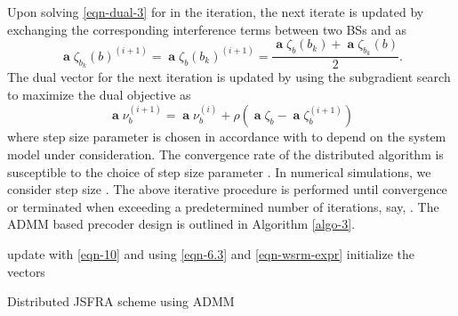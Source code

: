 Upon solving \eqref{eqn-dual-3} for  in the  iteration, the next iterate is updated by exchanging the corresponding interference terms between two \acp{BS}  and  as
\begin{equation}
\mbfa{\zeta}_{b_k}(b)^{(i+1)} = \mbfa{\zeta}_{b}(b_k)^{(i+1)} = \frac{\mbfa{\zeta}_{b}(b_k) + \mbfa{\zeta}_{b_k}(b)}{2}.
\label{if-sg-update}
\end{equation}
The dual vector for the next iteration is updated by using the subgradient search to maximize the dual objective as
\begin{equation}
\mbfa{\nu}_b^{(i+1)} = \mbfa{\nu}_b^{(i)} + \rho \left (\mbfa{\zeta}_b - \mbfa{\zeta}_b^{(i+1)} \right )
\label{dual-sg-update}
\end{equation}
where step size parameter \me{\rho} is chosen in accordance with \cite{boyd2011distributed} to depend on the system model under consideration. The convergence rate of the distributed algorithm is susceptible to the choice of step size parameter \me{\rho}. In numerical simulations, we consider step size . The above iterative procedure is performed until convergence or terminated when exceeding a predetermined number of iterations, say, . The \ac{ADMM} based precoder design is outlined in Algorithm \ref{algo-3}.
\begin{algorithm}
	\SetAlgoLined
	\DontPrintSemicolon
	\BlankLine
	update  with \eqref{eqn-10} and  using \eqref{eqn-6.3} and \eqref{eqn-wsrm-expr} \;
	initialize the vectors  \;
	\caption{Distributed \ac{JSFRA} scheme using \ac{ADMM}}
	\label{algo-3}
\end{algorithm}

